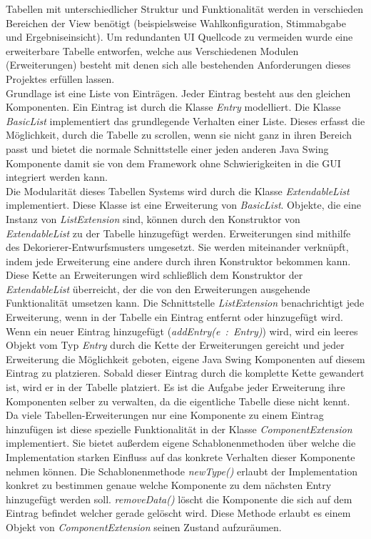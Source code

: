 \documentclass[parskip=full]{scrartcl}
\newcommand{\textitx}[1]{\mbox{\textit{#1}}}
\begin{document}
		Tabellen mit unterschiedlicher Struktur und Funktionalität werden in verschieden Bereichen der View benötigt (beispielsweise Wahlkonfiguration, Stimmabgabe und Ergebniseinsicht). Um redundanten UI Quellcode zu vermeiden wurde eine erweiterbare Tabelle entworfen, welche aus Verschiedenen Modulen (Erweiterungen) besteht mit denen sich alle bestehenden Anforderungen dieses Projektes erfüllen lassen.
		\\
		Grundlage ist eine Liste von Einträgen. Jeder Eintrag besteht aus den gleichen Komponenten. Ein Eintrag ist durch die Klasse \textitx{Entry} modelliert. Die Klasse \textitx{BasicList} implementiert das grundlegende Verhalten einer Liste. Dieses erfasst die Möglichkeit, durch die Tabelle zu scrollen, wenn sie nicht ganz in ihren Bereich passt und bietet die normale Schnittstelle einer jeden anderen Java Swing Komponente damit sie von dem Framework ohne Schwierigkeiten in die GUI integriert werden kann.
		\\
		Die Modularität dieses Tabellen Systems wird durch die Klasse \textitx{ExtendableList} implementiert. Diese Klasse ist eine Erweiterung von \textitx{BasicList}. Objekte, die eine Instanz von \textitx{ListExtension} sind, können durch den Konstruktor von \textitx{ExtendableList} zu der Tabelle hinzugefügt werden. Erweiterungen sind mithilfe des Dekorierer-Entwurfsmusters umgesetzt. Sie werden miteinander verknüpft, indem jede Erweiterung eine andere durch ihren Konstruktor bekommen kann. Diese Kette an Erweiterungen wird schließlich dem Konstruktor der \textitx{ExtendableList} überreicht, der die von den Erweiterungen ausgehende Funktionalität umsetzen kann. Die Schnittstelle \textitx{ListExtension} benachrichtigt jede Erweiterung, wenn in der Tabelle ein Eintrag entfernt oder hinzugefügt wird. Wenn ein neuer Eintrag hinzugefügt (\textitx{addEntry(e : Entry)}) wird, wird ein leeres Objekt vom Typ \textitx{Entry} durch die Kette der Erweiterungen gereicht und jeder Erweiterung die Möglichkeit geboten, eigene Java Swing Komponenten auf diesem Eintrag zu platzieren. Sobald dieser Eintrag durch die komplette Kette gewandert ist, wird er in der Tabelle platziert. Es ist die Aufgabe jeder Erweiterung ihre Komponenten selber zu verwalten, da die eigentliche Tabelle diese nicht kennt. Da viele Tabellen-Erweiterungen nur eine Komponente zu einem Eintrag hinzufügen ist diese spezielle Funktionalität in der Klasse \textitx{ComponentExtension} implementiert. Sie bietet außerdem eigene Schablonenmethoden über welche die Implementation starken Einfluss auf das konkrete Verhalten dieser Komponente nehmen können. Die Schablonenmethode \textitx{newType()} erlaubt der Implementation konkret zu bestimmen genaue welche Komponente zu dem nächsten Entry hinzugefügt werden soll. \textitx{removeData()} löscht die Komponente die sich auf dem Eintrag befindet welcher gerade gelöscht wird. Diese Methode erlaubt es einem Objekt von \textitx{ComponentExtension} seinen Zustand aufzuräumen.
\end{document}
